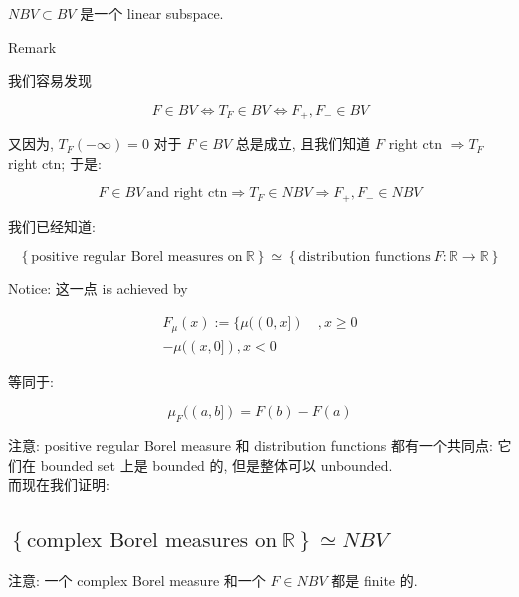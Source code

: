 \begin{proposition}

\(NBV \subset BV\) 是一个 linear subspace.

\end{proposition}

\begin{qlremark}{Remark}

我们容易发现

\[F \in BV\Leftrightarrow T_{F} \in BV\Leftrightarrow F_{+},F_{-} \in BV\]

又因为, \(T_{F}( - \infty) = 0\) 对于 \(F \in BV\) 总是成立, 且我们知道 \(F\) right ctn \(\Longrightarrow T_{F}\) right ctn; 于是:

\[F \in BV\ \text{and right ctn}\Longrightarrow T_{F} \in NBV\Longrightarrow F_{+},F_{-} \in NBV\]

\end{qlremark}

我们已经知道:

\[\left\{ {\text{positive regular Borel measures on}\ \mathbb{R}} \right\} \simeq \left\{ {\text{distribution functions}\ F:\mathbb{R}\rightarrow\mathbb{R}} \right\}\]

Notice: 这一点 is achieved by

\[\begin{matrix}
{F_{\mu}(x) := \{\mu((0,x\rbrack)\quad,x \geq 0} \\
{- \mu((x,0\rbrack),x < 0}
\end{matrix}\]

等同于:

\[\mu_{F}((a,b\rbrack) = F(b) - F(a)\]

注意: positive regular Borel measure 和 distribution functions 都有一个共同点: 它们在 bounded set 上是 bounded 的, 但是整体可以 unbounded.\\
而现在我们证明:

\subsection{\texorpdfstring{\(\left\{ {\text{complex Borel measures on}\ \mathbb{R}} \right\} \simeq NBV\)}{\textbackslash left\textbackslash\{ \{\textbackslash text\{complex Borel measures on\}\textbackslash{} \textbackslash mathbb\{R\}\} \textbackslash right\textbackslash\} \textbackslash simeq NBV}}

注意: 一个 complex Borel measure 和一个 \(F \in NBV\) 都是 finite 的.

